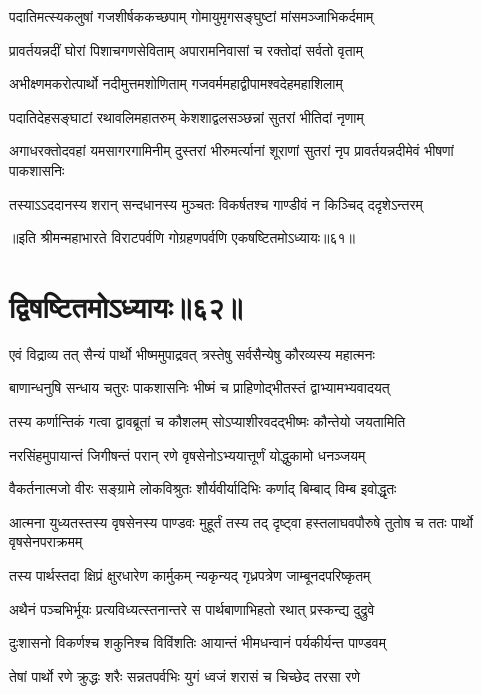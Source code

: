 \twolineshloka
{पदातिमत्स्यकलुषां गजशीर्षककच्छपाम्}
{गोमायुमृगसङ्घुष्टां मांसमञ्जाभिकर्दमाम्}


\twolineshloka
{प्रावर्तयन्नदीं घोरां पिशाचगणसेविताम्}
{अपारामनिवासां च रक्तोदां सर्वतो वृताम्}


\twolineshloka
{अभीक्ष्णमकरोत्पार्थो नदीमुत्तमशोणिताम्}
{गजवर्ममहाद्वीपामश्वदेहमहाशिलाम्}


\twolineshloka
{पदातिदेहसङ्घाटां रथावलिमहातरुम्}
{केशशाद्वलसञ्छन्नां सुतरां भीतिदां नृणाम्}


\threelineshloka
{अगाधरक्तोदवहां यमसागरगामिनीम्}
{दुस्तरां भीरुमर्त्यानां शूराणां सुतरां नृप}
{प्रावर्तयन्नदीमेवं भीषणां पाकशासनिः}


\twolineshloka
{तस्याऽऽददानस्य शरान् सन्दधानस्य मुञ्चतः}
{विकर्षतश्च गाण्डीवं न किञ्चिद् ददृशेऽन्तरम्}

॥इति श्रीमन्महाभारते विराटपर्वणि गोग्रहणपर्वणि एकषष्टितमोऽध्यायः॥६१॥

\chapter{द्विषष्टितमोऽध्यायः॥६२॥}

\twolineshloka
{एवं विद्राव्य तत् सैन्यं पार्थो भीष्ममुपाद्रवत्}
{त्रस्तेषु सर्वसैन्येषु कौरव्यस्य महात्मनः}


\twolineshloka
{बाणान्धनुषि सन्धाय चतुरः पाकशासनिः}
{भीष्मं च प्राहिणोद्भीतस्तं द्वाभ्यामभ्यवादयत्}


\twolineshloka
{तस्य कर्णान्तिकं गत्वा द्वावब्रूतां च कौशलम्}
{सोऽप्याशीरवदद्भीष्मः कौन्तेयो जयतामिति}


\twolineshloka
{नरसिंहमुपायान्तं जिगीषन्तं परान् रणे}
{वृषसेनोऽभ्ययात्तूर्णं योद्धुकामो धनञ्जयम्}


\twolineshloka
{वैकर्तनात्मजो वीरः सङ्ग्रामे लोकविश्रुतः}
{शौर्यवीर्यादिभिः कर्णाद् बिम्बाद् विम्ब इवोद्धृतः}


\threelineshloka
{आत्मना युध्यतस्तस्य वृषसेनस्य पाण्डवः}
{मुहूर्तं तस्य तद् दृष्ट्वा हस्तलाघवपौरुषे}
{तुतोष च ततः पार्थो वृषसेनपराक्रमम्}


\twolineshloka
{तस्य पार्थस्तदा क्षिप्रं क्षुरधारेण कार्मुकम्}
{न्यकृन्यद् गृध्रपत्रेण जाम्बूनदपरिष्कृतम्}


\twolineshloka
{अथैनं पञ्चभिर्भूयः प्रत्यविध्यत्स्तनान्तरे}
{स पार्थबाणाभिहतो रथात् प्रस्कन्द्य दुद्रुवे}


\twolineshloka
{दुःशासनो विकर्णश्च शकुनिश्च विविंशतिः}
{आयान्तं भीमधन्वानं पर्यकीर्यन्त पाण्डवम्}


\twolineshloka
{तेषां पार्थो रणे क्रुद्धः शरैः सन्नतपर्वभिः}
{युगं ध्वजं शरासं च चिच्छेद तरसा रणे}


